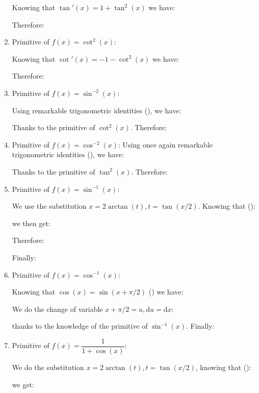 \begin{enumerate}
		Knowing that $\tan'(x)=1+\tan^2(x)$ we have:
		
		Therefore:
		
		\item Primitive of $f(x)=\cot ^{2}(x)$:
		
		Knowing that $\cot'(x)=-1-\cot^2(x)$ we have:
		
		Therefore:
		
		\item Primitive of $f(x)=\sin ^{-2}(x)$:
		
		Using remarkable trigonometric identities (), we have:
		
		Thanks to the primitive of $\cot^2(x)$. Therefore:
		
		\item Primitive of $f(x)=\cos ^{-2}(x)$:
		Using once again remarkable trigonometric identities (), we have:
		
		Thanks to the primitive of $\tan^2(x)$. Therefore:
		
		\item Primitive of $f(x)=\sin ^{-1}(x)$:
		
		We use the substitution $x=2\arctan(t),t=\tan(x/2)$. Knowing that ():
		
		we then get:
		
		Therefore:
		
		Finally:
		
		\item Primitive of $f(x)=\cos ^{-1}(x)$:
		
		Knowing that $\cos(x)=\sin(x+\pi/2)$ () we have:
		
		We do the change of variable $x+\pi/2=u, \mathrm{d}u=\mathrm{d}x$:
		
		thanks to the knowledge of the primitive of $\sin ^{-1}(x)$. Finally:
		
		\item Primitive of $f(x)=\dfrac{1}{1+\cos(x)}$:
		
		We do the substitution $x=2\arctan(t),t=\tan(x/2)$, knowing that ():
		
		we get:
		

\end{enumerate}
